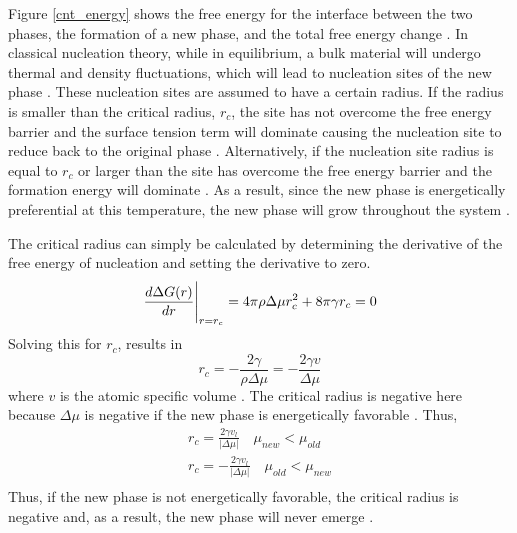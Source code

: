 Figure \ref{cnt_energy} shows the free energy for the interface between the two phases, the formation of a new phase, and the total free energy change \cite{debenedetti1996metastable}.  In classical nucleation theory, while in equilibrium, a bulk material will undergo thermal and density fluctuations, which will lead to nucleation sites of the new phase \cite{mutaftschiev2001atomistic}.  These nucleation sites are assumed to have a certain radius.  If the radius is smaller than the critical radius, $r_{c}$, the site has not overcome the free energy barrier and the surface tension term will dominate causing the nucleation site to reduce back to the original phase \cite{mutaftschiev2001atomistic}.  Alternatively, if the nucleation site radius is equal to $r_{c}$ or larger than the site has overcome the free energy barrier and the formation energy will dominate \cite{mutaftschiev2001atomistic}.  As a result, since the new phase is energetically preferential at this temperature, the new phase will grow throughout the system \cite{debenedetti1996metastable}.  

The critical radius can simply be calculated by determining the derivative of the free energy of nucleation and setting the derivative to zero.
\begin{equation}
	\frac{d \Delta G(r)}{d r}\Bigg{|}_{r=r_{c}} = 4\pi\rho\Delta\mu r_{c}^2 + 8\pi \gamma r_{c} = 0
\end{equation}
Solving this for $r_{c}$, results in
\begin{equation}
	r_{c} = -\frac{2\gamma}{\rho\Delta\mu} = -\frac{2\gamma v}{\Delta\mu}
\end{equation}
where $v$ is the atomic specific volume \cite{Vehkamaki2006}.  The critical radius is negative here because $\Delta\mu$ is negative if the new phase is energetically favorable \cite{Vehkamaki2006}.  Thus,
\begin{equation}
\begin{split}
r_{c} = \frac{2\gamma v_l}{|\Delta\mu|} \quad \mu_{new} < \mu_{old} \\
r_{c} = -\frac{2\gamma v_l}{|\Delta\mu|} \quad \mu_{old} < \mu_{new} \\
\end{split}
\end{equation}
Thus, if the new phase is not energetically favorable, the critical radius is negative and, as a result, the new phase will never emerge \cite{Vehkamaki2006}.  

